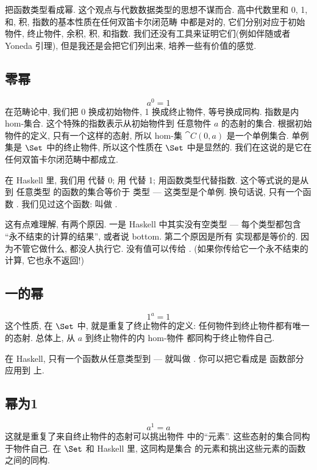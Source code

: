 把函数类型看成幂. 这个观点与代数数据类型的思想不谋而合. 高中代数里和 0, 1, 和, 积, 指数的基本性质在任何双笛卡尔闭范畴
中都是对的, 它们分别对应于初始物件, 终止物件, 余积, 积, 和指数. 我们还没有工具来证明它们(例如伴随或者 Yoneda 引理),
但是我还是会把它们列出来, 培养一些有价值的感觉.

\subsection{零幂}

\[a^{0} = 1\]
在范畴论中, 我们把 0 换成初始物件, 1 换成终止物件, 等号换成同构. 指数是内 hom-集合. 这个特殊的指数表示从初始物件到
任意物件 $a$ 的态射的集合. 根据初始物件的定义, 只有一个这样的态射, 所以 hom-集 $\cat{C}(0, a)$ 是一个单例集合.
单例集是 $\Set$ 中的终止物件, 所以这个性质在 $\Set$ 中是显然的. 我们在这说的是它在任何双笛卡尔闭范畴中都成立.

在 Haskell 里, 我们用  代替 0; 用 \code{()} 代替 1; 用函数类型代替指数. 这个等式说的是从  到
任意类型  的函数的集合等价于 \code{()} 类型 --- 这类型是个单例. 换句话说, 只有一个函数 .
我们见过这个函数: 叫做 .

这有点难理解, 有两个原因. 一是 Haskell 中其实没有空类型 --- 每个类型都包含 ``永不结束的计算的结果'', 或者说 bottom.
第二个原因是所有  实现都是等价的. 因为不管它做什么, 都没人执行它. 没有值可以传给 .
(如果你传给它一个永不结束的计算, 它也永不返回!)


\subsection{一的幂}

\[1^{a} = 1\]
这个性质, 在 $\Set$ 中, 就是重复了终止物件的定义: 任何物件到终止物件都有唯一的态射. 总体上, 从 $a$ 到终止物件的内 hom-物件
都同构于终止物件自己.

在 Haskell, 只有一个函数从任意类型到 \code{()} --- 就叫做 . 你可以把它看成是  函数部分应用到
\code{()} 上.

\subsection{幂为1}

\[a^{1} = a\]
这就是重复了来自终止物件的态射可以挑出物件  中的``元素''. 这些态射的集合同构于物件自己. 在 $\Set$ 和 Haskell 里,
这同构是集合  的元素和挑出这些元素的函数  之间的同构.

